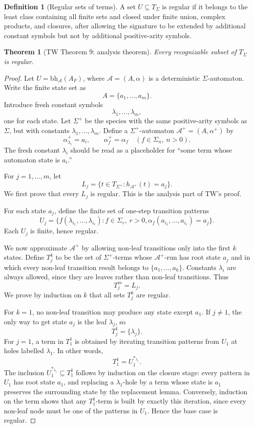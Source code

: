 \documentclass[11pt]{article}
\newtheorem*{theorem*}{Theorem}
\theoremstyle{definition}
\newtheorem{definition}[theorem]{Definition}
\newcommand{\SigmaSym}{\Sigma}
\newcommand{\Term}[1]{T_{#1}}
\newcommand{\Aut}{\mathcal A}
\newcommand{\bh}{\mathrm{bh}}
\begin{document}
\begin{definition}[Regular sets of terms]
A set \(U\subseteq\Term{\SigmaSym}\) is regular if it belongs to the least class
containing all finite sets and closed under finite union, complex products, and
closures, after allowing the signature to be extended by additional constant
symbols but not by additional positive-arity symbols.
\end{definition}

\begin{theorem*}[TW Theorem 9: analysis theorem]
Every recognizable subset of \(\Term{\SigmaSym}\) is regular.
\end{theorem*}

\begin{proof}
Let \(U=\bh_\Aut(A_F)\), where \(\Aut=(A,\alpha)\) is a deterministic
\(\SigmaSym\)-automaton.  Write the finite state set as
\[
  A=\{a_1,\ldots,a_m\}.
\]
Introduce fresh constant symbols
\[
  \lambda_1,\ldots,\lambda_m,
\]
one for each state.  Let \(\Sigma^+\) be the species with the same
positive-arity symbols as \(\SigmaSym\), but with constants
\(\lambda_1,\ldots,\lambda_m\).  Define a \(\Sigma^+\)-automaton
\(\Aut^+=(A,\alpha^+)\) by
\[
  \alpha^+_{\lambda_i}=a_i,
  \qquad
  \alpha^+_f=\alpha_f
  \quad(f\in\SigmaSym_n,\ n>0).
\]
The fresh constant \(\lambda_i\) should be read as a placeholder for ``some
term whose automaton state is \(a_i\).''

For \(j=1,\ldots,m\), let
\[
  L_j=\{t\in\Term{\Sigma^+}:h_{\Aut^+}(t)=a_j\}.
\]
We first prove that every \(L_j\) is regular.  This is the analysis part of
TW's proof.

For each state \(a_j\), define the finite set of one-step transition patterns
\[
  U_j=
  \{f(\lambda_{i_1},\ldots,\lambda_{i_r}):
      f\in\SigmaSym_r,\ r>0,
      \alpha_f(a_{i_1},\ldots,a_{i_r})=a_j\}.
\]
Each \(U_j\) is finite, hence regular.

We now approximate \(\Aut^+\) by allowing non-leaf transitions only into the
first \(k\) states.  Define \(T_j^k\) to be the set of \(\Sigma^+\)-terms whose
\(\Aut^+\)-run has root state \(a_j\) and in which every non-leaf transition
result belongs to \(\{a_1,\ldots,a_k\}\).  Constants \(\lambda_i\) are always
allowed, since they are leaves rather than non-leaf transitions.  Thus
\[
  T_j^m=L_j.
\]
We prove by induction on \(k\) that all sets \(T_j^k\) are regular.

For \(k=1\), no non-leaf transition may produce any state except \(a_1\).  If
\(j\ne1\), the only way to get state \(a_j\) is the leaf \(\lambda_j\), so
\[
  T_j^1=\{\lambda_j\}.
\]
For \(j=1\), a term in \(T_1^1\) is obtained by iterating transition patterns
from \(U_1\) at holes labelled \(\lambda_1\).  In other words,
\[
  T_1^1=U_1^{*_{\lambda_1}}.
\]
The inclusion \(U_1^{*_{\lambda_1}}\subseteq T_1^1\) follows by induction on
the closure stage: every pattern in \(U_1\) has root state \(a_1\), and replacing
a \(\lambda_1\)-hole by a term whose state is \(a_1\) preserves the surrounding
state by the replacement lemma.  Conversely, induction on the term shows that
any \(T_1^1\)-term is built by exactly this iteration, since every non-leaf node
must be one of the patterns in \(U_1\).  Hence the base case is regular.


\end{proof}
\end{document}
